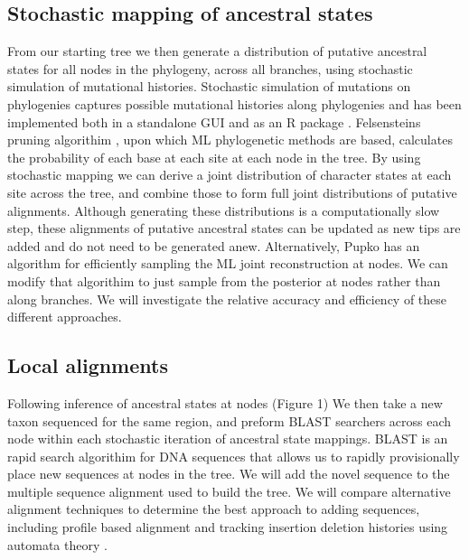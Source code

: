 \documentclass[10pt]{article}
\begin{document}
\subsection*{Stochastic mapping of ancestral states}
From our starting tree we then generate a distribution of putative ancestral states for all nodes in the phylogeny, across all branches, using stochastic simulation of mutational histories. 
Stochastic simulation of mutations on phylogenies captures possible mutational histories along phylogenies \cite{nielsen_mapping_2002}\cite{huelsenbeck_stochastic_2003} and has been implemented both in a standalone GUI \cite{bollback_simmap:_2006} and as an R package \cite{revell_phytools:_2012}. 
Felsensteins pruning algorithim \cite{felsenstein_evolutionary_1981}, upon which ML phylogenetic methods are based, calculates the probability of each base at each site at each node in the tree. 
By using stochastic mapping we can derive a joint distribution of character states at each site across the tree, and combine those to form full joint distributions of putative alignments. 
Although generating these distributions is a computationally slow step, these alignments of putative ancestral states can be updated as new tips are added and do not need to be generated anew. 
Alternatively, Pupko\cite{pupko_fast_2000} \cite{Ashkenazy_FastML:_2012} has an algorithm for efficiently sampling the ML joint reconstruction at nodes. 
We can modify that algorithim to just sample from the posterior at nodes rather than along branches.
We will investigate the relative accuracy and efficiency of these different approaches.

\subsection*{Local alignments}
Following inference of ancestral states at nodes (Figure 1) We then take a new taxon sequenced for the same region, and preform BLAST searchers across each node within each stochastic iteration of ancestral state mappings. 
BLAST is an rapid search algorithim for DNA sequences that allows us to rapidly provisionally place new sequences at nodes in the tree. 
We will add the novel sequence to the multiple sequence alignment used to build the tree. 
We will compare alternative alignment techniques to determine the best approach to adding sequences, including profile based alignment \cite{loytynoja_accurate_2012} \cite{smith_mega-phylogeny_2009} and tracking insertion deletion histories using automata theory \cite{westesson_accurate_2012}.
\end{document}
